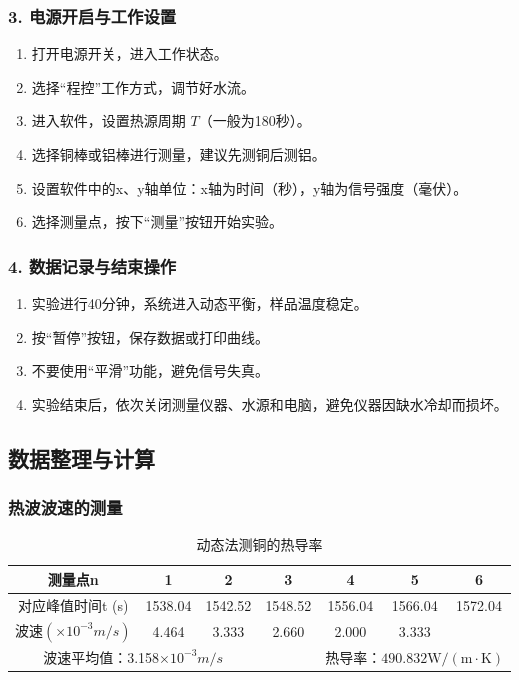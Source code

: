 \documentclass[zihao=5, UTF8]{article}
\theoremstyle{MyLineTheoremStyle} %
\theoremstyle{MyBlockTheoremStyle} %
\theoremstyle{MySubsubsectionStyle} %
\begin{document}
\subsubsection*{3. 电源开启与工作设置}
\begin{enumerate}
    \item 打开电源开关，进入工作状态。
    \item 选择“程控”工作方式，调节好水流。
    \item 进入软件，设置热源周期 $T$（一般为180秒）。
    \item 选择铜棒或铝棒进行测量，建议先测铜后测铝。
    \item 设置软件中的x、y轴单位：x轴为时间（秒），y轴为信号强度（毫伏）。
    \item 选择测量点，按下“测量”按钮开始实验。
\end{enumerate}

\subsubsection*{4. 数据记录与结束操作}
\begin{enumerate}
    \item 实验进行40分钟，系统进入动态平衡，样品温度稳定。
    \item 按“暂停”按钮，保存数据或打印曲线。
    \item 不要使用“平滑”功能，避免信号失真。
    \item 实验结束后，依次关闭测量仪器、水源和电脑，避免仪器因缺水冷却而损坏。
\end{enumerate}

\subsection{数据整理与计算}

\subsubsection{热波波速的测量}

\begin{table}[H]
    \centering
    \begin{tabular}{|c|c|c|c|c|c|c|}
    \hline
        测量点n & 1 & 2 & 3 & 4 & 5 & 6 \\ \hline
        对应峰值时间t (s) & 1538.04 & 1542.52 & 1548.52 & 1556.04 & 1566.04 & 1572.04 \\ \hline
        波速$(\times10^{-3}m/s)$ & 4.464 & 3.333 & 2.660 & 2.000 & 3.333 & ~ \\ \hline
        \multicolumn{3}{|c|}{波速平均值：3.158$\times10^{-3}m/s$} & ~ & \multicolumn{3}{c|}{热导率：$490.832 \mathrm{W/(m \cdot K)}$} \\ \hline
    \end{tabular}
    \caption{动态法测铜的热导率}
\end{table}
\end{document}

